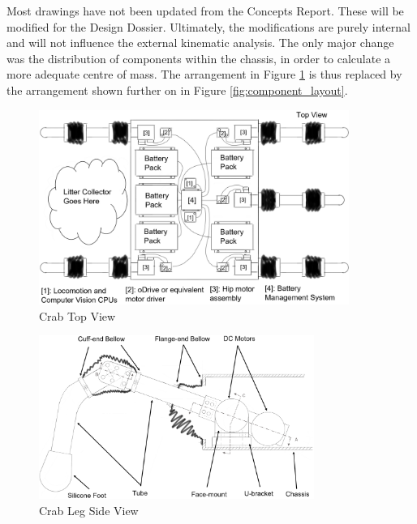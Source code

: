 Most drawings have not been updated from the Concepts Report. These will be modified for the Design Dossier.
Ultimately, the modifications are purely internal and will not influence the external kinematic analysis. The only major change was the distribution of components within the chassis, in order to calculate a more adequate centre of mass. The arrangement in Figure \ref{fig:crab_top_view} is thus replaced by the arrangement shown further on in Figure \ref{fig:component_layout}. 

\begin{figure}
    \centering
    \includegraphics[width=0.9\textwidth]{2_DesignSolution/img/crab_top_view.png}
    \caption{Crab Top View}
    \label{fig:crab_top_view}
\end{figure}

\begin{figure}
    \centering
    \includegraphics[width=0.8\textwidth]{2_DesignSolution/img/crab_leg.png}
    \caption{Crab Leg Side View}
    \label{fig:crab_leg}
\end{figure}

